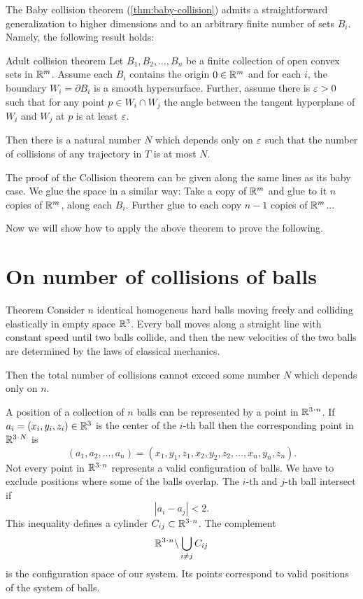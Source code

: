 


\qeds

The Baby collision theorem (\ref{thm:baby-collision}) admits a straightforward generalization to higher dimensions and to an arbitrary finite number of sets $B_i$.
Namely, the following result holds:

\begin{thm}{Adult collision theorem}\label{thm:adult-collision}
Let $B_1,B_2,\dots,B_n$ be a finite collection of open convex sets in $\mathbb{R}^m$.
Assume each $B_i$ contains the origin $0\in\mathbb{R}^m$
and for each $i$, the boundary $W_i=\partial B_i$ is a smooth hypersurface.
Further, assume there is $\varepsilon>0$ such that for any point $p\in W_i\cap W_j$ the angle between the tangent 
hyperplane of $W_i$ and $W_j$ at $p$ is at least $\varepsilon$.

Then 
there is a natural number $N$ which depends only on $\varepsilon$
such that the number of collisions of any trajectory in $T$ is at most $N$.
\end{thm}

The proof of the Collision theorem can be given along the same lines as its baby case.
We glue the space in a similar way:
Take a copy of $\mathbb{R}^m$
and glue to it $n$ copies of $\mathbb{R}^m$, along each $B_i$.
Further glue to each copy $n-1$ copies of $\mathbb{R}^m$... 

Now we will show how to apply the above theorem to prove the following. 

\section{On number of collisions of balls}

\begin{thm}{Theorem}\label{thm:balls}
Consider $n$ identical homogeneus hard balls
moving freely and colliding
elastically in empty space $\mathbb{R}^3$. 
Every ball moves
along a straight line with constant speed until two balls collide, and then
the new velocities of the two balls are determined by the
laws of classical mechanics.

Then the total number of collisions cannot exceed some number $N$ which depends only on $n$.
\end{thm}

A position of a collection of $n$ balls can be represented by a point in $\RR^{3\cdot n}$.
If $a_i=(x_i,y_i,z_i) \in \mathbb{R}^3$ is the center of the $i$-th ball
then
the corresponding point in $\RR^{3\cdot N}$ is
$$(a_1, a_2 , \dots , a_n ) = (x_1, y_1 , z_1 , x_2 , y_2 , z_2 , \dots , x_n , y_n , z_n).$$
Not every point in $\RR^{3\cdot n}$ represents a valid configuration of balls. 
We have to exclude positions where some of the balls overlap. 
The $i$-th and $j$-th ball intersect if 
$$|a_i - a_j | < 2.$$ 
This inequality defines a cylinder $C_{ij} \subset \RR^{3\cdot n}$. 
The complement
$$\RR^{3\cdot n}\backslash \bigcup_{i\ne j} C_{ij}$$ is the configuration space of our system. 
Its points correspond
to valid positions of the system of balls.

